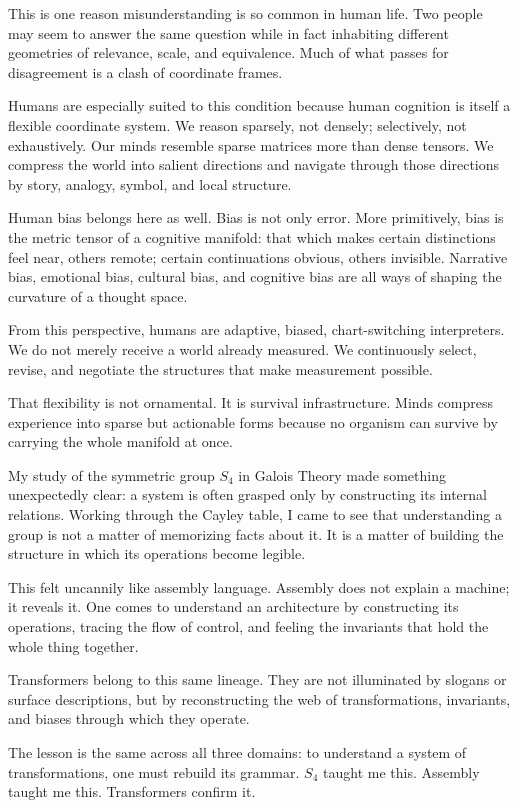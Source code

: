 This is one reason misunderstanding is so common in human life. Two
people may seem to answer the same question while in fact inhabiting
different geometries of relevance, scale, and equivalence. Much of what
passes for disagreement is a clash of coordinate frames.

Humans are especially suited to this condition because human cognition
is itself a flexible coordinate system. We reason sparsely, not densely;
selectively, not exhaustively. Our minds resemble sparse matrices more
than dense tensors. We compress the world into salient directions and
navigate through those directions by story, analogy, symbol, and local
structure.

Human bias belongs here as well. Bias is not only error. More
primitively, bias is the metric tensor of a cognitive manifold: that
which makes certain distinctions feel near, others remote; certain
continuations obvious, others invisible. Narrative bias, emotional bias,
cultural bias, and cognitive bias are all ways of shaping the curvature
of a thought space.

From this perspective, humans are adaptive, biased, chart-switching
interpreters. We do not merely receive a world already measured. We
continuously select, revise, and negotiate the structures that make
measurement possible.

That flexibility is not ornamental. It is survival infrastructure. Minds
compress experience into sparse but actionable forms because no organism
can survive by carrying the whole manifold at once.

My study of the symmetric group \(S_4\) in Galois Theory made something
unexpectedly clear: a system is often grasped only by constructing its
internal relations. Working through the Cayley table, I came to see that
understanding a group is not a matter of memorizing facts about it. It
is a matter of building the structure in which its operations become
legible.

This felt uncannily like assembly language. Assembly does not explain a
machine; it reveals it. One comes to understand an architecture by
constructing its operations, tracing the flow of control, and feeling
the invariants that hold the whole thing together.

Transformers belong to this same lineage. They are not illuminated by
slogans or surface descriptions, but by reconstructing the web of
transformations, invariants, and biases through which they operate.

The lesson is the same across all three domains: to understand a system
of transformations, one must rebuild its grammar. \(S_4\) taught me
this. Assembly taught me this. Transformers confirm it.

